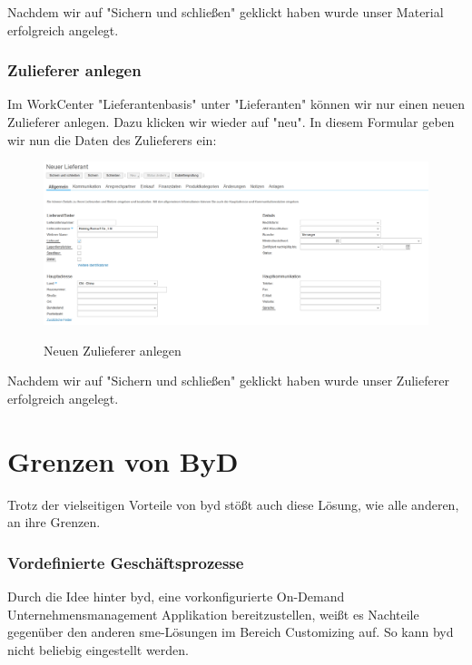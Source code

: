 Nachdem wir auf "Sichern und schließen" geklickt haben wurde unser Material erfolgreich angelegt.

\subsubsection{Zulieferer anlegen}

Im WorkCenter "Lieferantenbasis" unter "Lieferanten" können wir nur einen neuen Zulieferer anlegen. Dazu klicken wir wieder auf "neu". In diesem Formular geben wir nun die Daten des Zulieferers ein:

\begin{figure}[H]
	\begin{center}
	\includegraphics[width=1.0\textwidth]{grafiken/ByDesign-HowTo-2.png}
	\caption{Neuen Zulieferer anlegen}
	\vspace{-10pt}
	\label{abb:byd-newsupplier}
	\end{center}
\end{figure}

Nachdem wir auf "Sichern und schließen" geklickt haben wurde unser Zulieferer erfolgreich angelegt.

\section{Grenzen von ByD}

Trotz der vielseitigen Vorteile von \gls{byd} stößt auch diese Lösung, wie alle anderen, an ihre Grenzen.

\subsubsection{Vordefinierte Geschäftsprozesse}

Durch die Idee hinter \gls{byd}, eine vorkonfigurierte On-Demand Unternehmensmanagement Applikation bereitzustellen, weißt es Nachteile gegenüber den anderen \gls{sme}-Lösungen im Bereich Customizing auf. So kann \gls{byd} nicht beliebig eingestellt werden.

